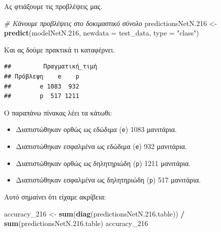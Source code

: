 \documentclass[
]{article}
\newenvironment{Shaded}{\begin{snugshade}}{\end{snugshade}}
\newcommand{\AttributeTok}[1]{\textcolor[rgb]{0.13,0.29,0.53}{#1}}
\newcommand{\CommentTok}[1]{\textcolor[rgb]{0.56,0.35,0.01}{\textit{#1}}}
\newcommand{\FloatTok}[1]{\textcolor[rgb]{0.00,0.00,0.81}{#1}}
\newcommand{\FunctionTok}[1]{\textcolor[rgb]{0.13,0.29,0.53}{\textbf{#1}}}
\newcommand{\NormalTok}[1]{#1}
\newcommand{\OtherTok}[1]{\textcolor[rgb]{0.56,0.35,0.01}{#1}}
\newcommand{\SpecialCharTok}[1]{\textcolor[rgb]{0.81,0.36,0.00}{\textbf{#1}}}
\newcommand{\StringTok}[1]{\textcolor[rgb]{0.31,0.60,0.02}{#1}}
\begin{document}
Ας φτιάξουμε τις προβλέψεις μας.

\begin{Shaded}
\begin{Highlighting}[]
\CommentTok{\# Κάνουμε προβλέψεις στο δοκιμαστικό σύνολο}
\NormalTok{predictionsNetN}\FloatTok{.216} \OtherTok{\textless{}{-}} \FunctionTok{predict}\NormalTok{(modelNetN}\FloatTok{.216}\NormalTok{, }\AttributeTok{newdata =}\NormalTok{ test\_data, }\AttributeTok{type =} \StringTok{"class"}\NormalTok{)}
\end{Highlighting}
\end{Shaded}

Και ας δούμε πρακτικά τι καταφέρνει.

\begin{Shaded}
\end{Shaded}

\begin{verbatim}
##         Πραγματική_τιμή
## Πρόβλεψη    e    p
##        e 1083  932
##        p  517 1211
\end{verbatim}

Ο παραπάνω πίνακας λέει τα κάτωθι:

\begin{itemize}
\item
  Διαπιστώθηκαν ορθώς ως εδώδιμα (\texttt{e}) 1083 μανιτάρια.
\item
  Διαπιστώθηκαν εσφαλμένα ως εδώδιμα (\texttt{e}) 932 μανιτάρια.
\item
  Διαπιστώθηκαν ορθώς ως δηλητηριώδη (\texttt{p}) 1211 μανιτάρια.
\item
  Διαπιστώθηκαν εσφαλμένα ως δηλητηριώδη (\texttt{p}) 517 μανιτάρια.
\end{itemize}

Αυτό σημαίνει ότι είχαμε ακρίβεια:

\begin{Shaded}
\begin{Highlighting}[]
\NormalTok{accuracy\_216 }\OtherTok{\textless{}{-}} \FunctionTok{sum}\NormalTok{(}\FunctionTok{diag}\NormalTok{(predictionsNetN.}\FloatTok{216.}\NormalTok{table)) }\SpecialCharTok{/} \FunctionTok{sum}\NormalTok{(predictionsNetN.}\FloatTok{216.}\NormalTok{table)}
\NormalTok{accuracy\_216}
\end{Highlighting}
\end{Shaded}
\end{document}
